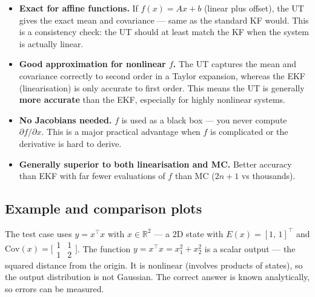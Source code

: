 \documentclass[12pt, a4paper]{article}
\begin{document}
\begin{keybox}
  \begin{itemize}[leftmargin=1.4em, topsep=2pt]
    \item \textbf{Exact for affine functions.}
          If $f(x) = Ax + b$ (linear plus offset), the UT gives the
          exact mean and covariance --- same as the standard KF would.
          This is a consistency check: the UT should at least match
          the KF when the system is actually linear.
    \item \textbf{Good approximation for nonlinear $f$.}
          The UT captures the mean and covariance correctly to
          second order in a Taylor expansion, whereas the EKF
          (linearisation) is only accurate to first order.
          This means the UT is generally \textbf{more accurate}
          than the EKF, especially for highly nonlinear systems.
    \item \textbf{No Jacobians needed.}
          $f$ is used as a black box --- you never compute
          $\partial f / \partial x$.
          This is a major practical advantage when $f$ is
          complicated or the derivative is hard to derive.
    \item \textbf{Generally superior to both linearisation and MC.}
          Better accuracy than EKF with far fewer evaluations of
          $f$ than MC ($2n+1$ vs thousands).
  \end{itemize}
\end{keybox}

\subsection*{Example and comparison plots}

The test case uses $y = x^\top x$ with $x \in \mathbb{R}^2$ ---
a 2D state with $E(x) = [1,\,1]^\top$ and
$\mathrm{Cov}(x) = \bigl[\begin{smallmatrix}1&1\\1&2\end{smallmatrix}\bigr]$.
The function $y = x^\top x = x_1^2 + x_2^2$ is a scalar output ---
the squared distance from the origin.
It is nonlinear (involves products of states), so the output
distribution is not Gaussian.
The correct answer is known analytically, so errors can be measured.
\end{document}
